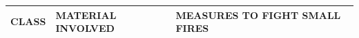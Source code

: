 \documentclass{article}
\begin{document}
\begin{table}[h!]
\begin{tabular}{|p{2cm}|p{5.5cm}|p{5.5cm}|}
\hline
CLASS & MATERIAL INVOLVED & MEASURES TO FIGHT SMALL FIRES \\ \hline


\end{tabular}
\end{table}
\end{document}
